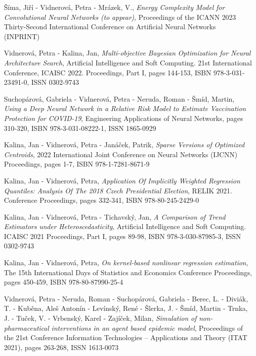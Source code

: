 \vspace{0.4em}
\noindent
Šíma, Jiří - Vidnerová, Petra - Mrázek, V., {\em Energy Complexity Model for Convolutional Neural Networks (to appear)}, Proceedings of the ICANN 2023 Thirty-Second International Conference on Artificial Neural Networks (INPRINT)

\vspace{0.4em}
\noindent
Vidnerová, Petra - Kalina, Jan, {\em Multi-objective Bayesian Optimization for Neural Architecture Search}, Artificial Intelligence and Soft Computing. 21st International Conference, ICAISC 2022. Proceedings, Part I, pages 144-153, ISBN 978-3-031-23491-0, ISSN 0302-9743

\vspace{0.4em}
\noindent
Suchopárová, Gabriela - Vidnerová, Petra - Neruda, Roman - Šmíd, Martin, {\em Using a Deep Neural Network in a Relative Risk Model to Estimate Vaccination Protection for COVID-19}, Engineering Applications of Neural Networks, pages 310-320, ISBN 978-3-031-08222-1, ISSN 1865-0929

\vspace{0.4em}
\noindent
Kalina, Jan - Vidnerová, Petra - Janáček, Patrik, {\em Sparse Versions of Optimized Centroids}, 2022 International Joint Conference on Neural Networks (IJCNN) Proceedings, pages 1-7, ISBN 978-1-7281-8671-9

\vspace{0.4em}
\noindent
Kalina, Jan - Vidnerová, Petra, {\em Application Of Implicitly Weighted Regression Quantiles: Analysis Of The 2018 Czech Presidential Election}, RELIK 2021. Conference Proceedings, pages 332-341, ISBN 978-80-245-2429-0

\vspace{0.4em}
\noindent
Kalina, Jan - Vidnerová, Petra - Tichavský, Jan, {\em A Comparison of Trend Estimators under Heteroscedasticity}, Artificial Intelligence and Soft Computing. ICAISC 2021 Proceedings, Part I, pages 89-98, ISBN 978-3-030-87985-3, ISSN 0302-9743

\vspace{0.4em}
\noindent
Kalina, Jan - Vidnerová, Petra, {\em On kernel-based nonlinear regression estimation}, The 15th International Days of Statistics and Economics Conference Proceedings, pages 450-459, ISBN 978-80-87990-25-4

\vspace{0.4em}
\noindent
Vidnerová, Petra - Neruda, Roman - Suchopárová, Gabriela - Berec, L. - Diviák, T. - Kuběna, Aleš Antonín - Levínský, René - Šlerka, J. - Šmíd, Martin - Trnka, J. - Tuček, V. - Vrbenský, Karel - Zajíček, Milan, {\em Simulation of non-pharmaceutical interventions in an agent based epidemic model}, Proceedings of the 21st Conference Information Technologies – Applications and Theory (ITAT 2021), pages 263-268, ISSN 1613-0073

